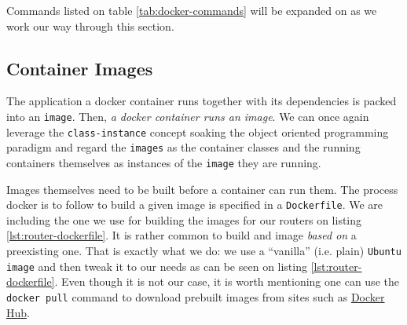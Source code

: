            Commands listed on table \ref{tab:docker-commands} will be expanded on as we work our way through this section.

        \subsection{Container Images}
            The application a docker container runs together with its dependencies is packed into an \texttt{image}. Then, \textit{a docker container runs an image}. We can once again leverage the \texttt{class-instance} concept soaking the object oriented programming paradigm and regard the \texttt{images} as the container classes and the running containers themselves as instances of the \texttt{image} they are running.

            Images themselves need to be built before a container can run them. The process docker is to follow to build a given image is specified in a \texttt{Dockerfile}. We are including the one we use for building the images for our routers on listing \ref{lst:router-dockerfile}. It is rather common to build and image \textit{based on} a preexisting one. That is exactly what we do: we use a ``vanilla'' (i.e. plain) \texttt{Ubuntu image} and then tweak it to our needs as can be seen on listing \ref{lst:router-dockerfile}. Even though it is not our case, it is worth mentioning one can use the \texttt{docker pull} command to download prebuilt images from sites such as \href{https://hub.docker.com}{Docker Hub}.

